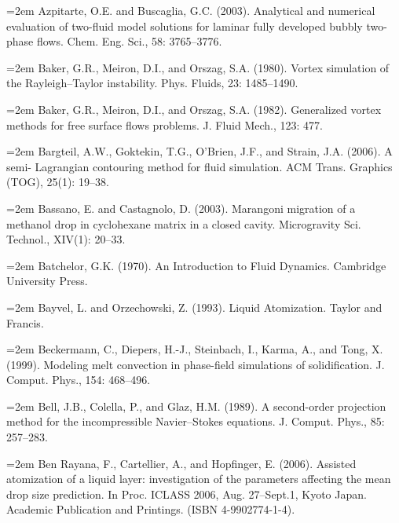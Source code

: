 \documentclass[11pt,a4paper,openany,fontset=none]{ctexbook}
\begin{document}
\par\hangindent=2em Azpitarte, O.E. and Buscaglia, G.C. (2003). Analytical and numerical evaluation of two-fluid model solutions for laminar fully developed bubbly two-phase flows. Chem. Eng. Sci., 58: 3765--3776.

\par\hangindent=2em Baker, G.R., Meiron, D.I., and Orszag, S.A. (1980). Vortex simulation of the Rayleigh--Taylor instability. Phys. Fluids, 23: 1485--1490.

\par\hangindent=2em Baker, G.R., Meiron, D.I., and Orszag, S.A. (1982). Generalized vortex methods for free surface flows problems. J. Fluid Mech., 123: 477.

\par\hangindent=2em Bargteil, A.W., Goktekin, T.G., O’Brien, J.F., and Strain, J.A. (2006). A semi- Lagrangian contouring method for fluid simulation. ACM Trans. Graphics (TOG), 25(1): 19--38.

\par\hangindent=2em Bassano, E. and Castagnolo, D. (2003). Marangoni migration of a methanol drop in cyclohexane matrix in a closed cavity. Microgravity Sci. Technol., XIV(1): 20--33.


\par\hangindent=2em Batchelor, G.K. (1970). An Introduction to Fluid Dynamics. Cambridge University Press.

\par\hangindent=2em Bayvel, L. and Orzechowski, Z. (1993). Liquid Atomization. Taylor and Francis.

\par\hangindent=2em Beckermann, C., Diepers, H.-J., Steinbach, I., Karma, A., and Tong, X. (1999). Modeling melt convection in phase-field simulations of solidification. J. Comput. Phys., 154: 468--496.

\par\hangindent=2em Bell, J.B., Colella, P., and Glaz, H.M. (1989). A second-order projection method for the incompressible Navier--Stokes equations. J. Comput. Phys., 85: 257--283.

\par\hangindent=2em Ben Rayana, F., Cartellier, A., and Hopfinger, E. (2006). Assisted atomization of a liquid layer: investigation of the parameters affecting the mean drop size prediction. In Proc. ICLASS 2006, Aug. 27--Sept.1, Kyoto Japan. Academic Publication and Printings. (ISBN 4-9902774-1-4).
\end{document}
